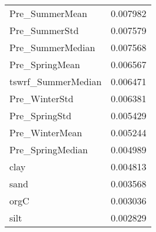 \begin{tabular}{lr}
Pre_SummerMean & 0.007982 \\
Pre_SummerStd & 0.007579 \\
Pre_SummerMedian & 0.007568 \\
Pre_SpringMean & 0.006567 \\
tswrf_SummerMedian & 0.006471 \\
Pre_WinterStd & 0.006381 \\
Pre_SpringStd & 0.005429 \\
Pre_WinterMean & 0.005244 \\
Pre_SpringMedian & 0.004989 \\
clay & 0.004813 \\
sand & 0.003568 \\
orgC & 0.003036 \\
silt & 0.002829 \\
\bottomrule
\end{tabular}
